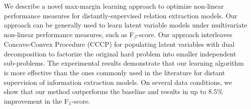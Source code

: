 We describe a novel max-margin learning approach to optimize non-linear performance measures for  distantly-supervised relation extraction models. Our approach can be generally used to learn latent variable models under multivariate non-linear performance measures, such as F$_\beta$-score. Our approach interleaves Concave-Convex Procedure (CCCP) for populating  latent variables with dual decomposition to factorize the original hard problem into smaller independent sub-problems. The experimental results demonstrate that our learning algorithm is more effective than the ones commonly used in the literature for distant supervision of information extraction models. On several data conditions, we show that our method outperforms the baseline and results in up to 8.5\% improvement in the F$_1$-score.
